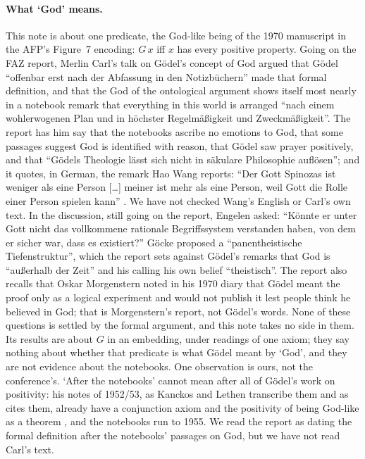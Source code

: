 \documentclass[11pt,a4paper]{article}
\theoremstyle{definition}
\theoremstyle{remark}
\begin{document}
\paragraph{What `God' means.}
This note is about one predicate, the God-like being of the 1970
manuscript in the AFP's Figure~7 encoding: \(G\,x\) iff \(x\) has every
positive property.
Going on the FAZ report, Merlin Carl's talk on G\"odel's concept of God argued
that G\"odel ``offenbar erst nach der Abfassung in den Notizb\"uchern'' made
that formal definition, and that the God of the ontological argument shows
itself most nearly in a notebook remark that everything in this world is
arranged ``nach einem wohlerwogenen Plan und in h\"ochster Regelm\"a\ss{}igkeit
und Zweckm\"a\ss{}igkeit''.
The report has him say that the notebooks ascribe no emotions to God, that
some passages suggest God is identified with reason, that G\"odel saw
prayer positively, and that ``G\"odels Theologie l\"asst sich nicht in
s\"akulare Philosophie aufl\"osen''; and it quotes, in German, the remark
Hao Wang reports: ``Der Gott Spinozas ist weniger als eine Person [\ldots]
meiner ist mehr als eine Person, weil Gott die Rolle einer Person spielen
kann'' \cite{vonRauchhaupt2026}.
We have not checked Wang's English or Carl's own text.
In the discussion, still going on the report, Engelen asked: ``K\"onnte er
unter Gott nicht das vollkommene rationale Begriffssystem verstanden haben,
von dem er sicher war, dass es existiert?''
G\"ocke proposed a ``panentheistische Tiefenstruktur'', which the report
sets against G\"odel's remarks that God is ``au\ss{}erhalb der Zeit'' and his
calling his own belief ``theistisch''.
The report also recalls that Oskar Morgenstern noted in his 1970 diary that
G\"odel meant the proof only as a logical experiment and would not publish
it lest people think he believed in God; that is Morgenstern's report, not
G\"odel's words.
None of these questions is settled by the formal argument, and this note
takes no side in them.
Its results are about \(G\) in an embedding, under readings of one axiom;
they say nothing about whether that predicate is what G\"odel meant by
`God', and they are not evidence about the notebooks.
One observation is ours, not the conference's.
`After the notebooks' cannot mean after all of G\"odel's work on positivity:
his notes of 1952/53, as Kanckos and Lethen transcribe them and as
\cite[v4, Sect.~2.1]{benzmuellerPWN2026} cites them, already have a
conjunction axiom and the positivity of being God-like as a theorem
\cite{kanckosLethen2021}, and the notebooks run to 1955.
We read the report as dating the formal definition after the notebooks'
passages on God, but we have not read Carl's text.
\end{document}
